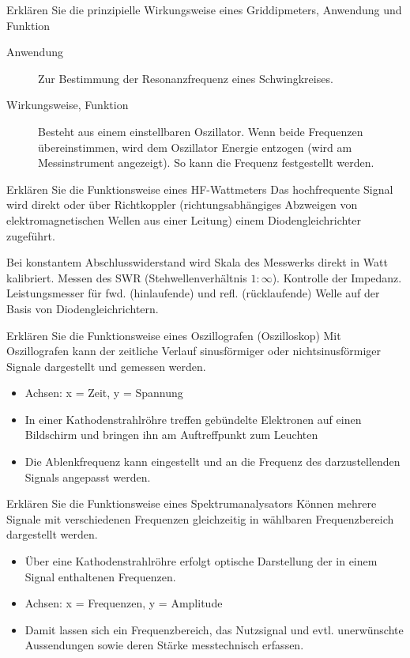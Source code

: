 \documentclass[avery5371,grid,frame,a4paper]{flashcards}
\newcommand{\card}[3]{
  \begin{flashcard}[{\chap} -- #1]{#2}#3\end{flashcard}
}
\begin{document}
\card{32}{Erklären Sie die prinzipielle Wirkungsweise eines Griddipmeters, Anwendung und Funktion}{
  \begin{description}
    \item[Anwendung] Zur Bestimmung der Resonanzfrequenz eines Schwingkreises.
    \item[Wirkungsweise, Funktion]
      Besteht aus einem einstellbaren Oszillator.
      Wenn beide Frequenzen übereinstimmen, wird dem Oszillator Energie entzogen (wird am Messinstrument angezeigt). So kann die Frequenz festgestellt werden.
  \end{description}
}
\card{33}{Erklären Sie die Funktionsweise eines HF-Wattmeters}{
  Das hochfrequente Signal wird direkt oder über Richtkoppler (richtungsabhängiges Abzweigen von elektromagnetischen Wellen aus einer Leitung) einem Diodengleichrichter zugeführt. 

  Bei konstantem Abschlusswiderstand wird Skala des Messwerks direkt in Watt kalibriert.
  Messen des SWR (Stehwellenverhältnis $1:\infty$).
  Kontrolle der Impedanz.
  Leistungsmesser für fwd. (hinlaufende) und refl. (rücklaufende) Welle auf der Basis von Diodengleichrichtern.
}
\card{34}{Erklären Sie die Funktionsweise eines Oszillografen (Oszilloskop)}{
  \small
  Mit Oszillografen kann der zeitliche Verlauf sinusförmiger oder nichtsinusförmiger Signale dargestellt und gemessen werden.

  \begin{itemize}
    \item Achsen: x = Zeit, y = Spannung
    \item In einer Kathodenstrahlröhre treffen gebündelte Elektronen auf einen Bildschirm und bringen ihn am Auftreffpunkt zum Leuchten
    \item Die Ablenkfrequenz kann eingestellt und an die Frequenz des darzustellenden Signals angepasst werden.
  \end{itemize}
}
\card{35}{Erklären Sie die Funktionsweise eines Spektrumanalysators}{
  \small
  Können mehrere Signale mit verschiedenen Frequenzen gleichzeitig in wählbaren Frequenzbereich dargestellt werden.

  \begin{itemize}
    \item Über eine Kathodenstrahlröhre erfolgt optische Darstellung der in einem Signal enthaltenen Frequenzen.
    \item Achsen: x = Frequenzen, y = Amplitude
    \item Damit lassen sich ein Frequenzbereich, das Nutzsignal und evtl. unerwünschte Aussendungen sowie deren Stärke messtechnisch erfassen.
  \end{itemize}
}
\end{document}
